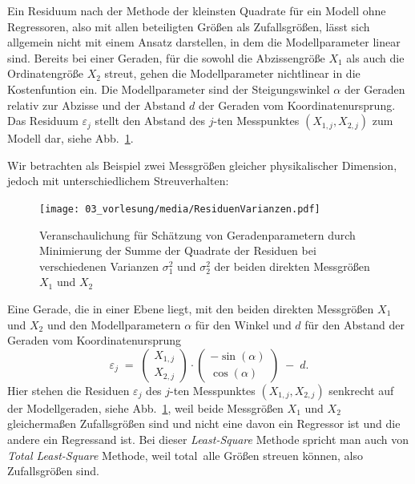 Ein Residuum nach der Methode der kleinsten Quadrate für ein Modell ohne Regressoren,
also mit allen beteiligten Größen als Zufallsgrößen, lässt sich allgemein nicht mit
einem Ansatz darstellen, in dem die Modellparameter linear sind. Bereits bei einer
Geraden, für die sowohl die Abzissengröße $X_1$ als auch die Ordinatengröße $X_2$ streut,
gehen die Modellparameter nichtlinear in die Kostenfuntion ein.
Die Modellparameter sind der Steigungswinkel $\alpha$ der Geraden relativ zur Abzisse und
der Abstand $d$ der Geraden vom Koordinatenursprung. Das Residuum $\varepsilon_j$ stellt den
Abstand des $j$-ten Messpunktes $(X_{1,j}, X_{2,j})$ zum Modell dar, siehe Abb.~\ref{ResiduenVarianzen}.

Wir betrachten als Beispiel zwei Messgrößen gleicher physikalischer Dimension, jedoch
mit unterschiedlichem Streuverhalten:
\begin{figure}
\begin{center}
\texttt{[image: 03\_vorlesung/media/ResiduenVarianzen.pdf]}
\end{center}
\caption{Veranschaulichung für Schätzung von Geradenparametern durch
Minimierung der Summe der Quadrate der Residuen bei verschiedenen Varianzen
$\sigma_1^2$ und $\sigma_2^2$ der beiden direkten Messgrößen $X_1$ und $X_2$
\label{ResiduenVarianzen}}
\end{figure}
Eine Gerade, die in einer Ebene liegt, mit den beiden direkten Messgrößen $X_1$ und $X_2$
und den Modellparametern $\alpha$ für den Winkel und
$d$ für den Abstand der Geraden vom Koordinatenursprung
\begin{equation}
\varepsilon_j \; = \;
\left(\begin{array}{c} X_{1,j}\\ X_{2,j}\end{array}\right) \cdot
\left(\begin{array}{c} -\sin(\alpha)\\ \cos(\alpha)\end{array}\right) \; - \; d .
\label{TLSgerade}
\end{equation}
Hier stehen die Residuen $\varepsilon_j$ des $j$-ten Messpunktes $(X_{1,j}, X_{2,j})$
senkrecht auf der Modellgeraden, siehe Abb.~\ref{ResiduenVarianzen}, weil beide
Messgrößen $X_1$ und $X_2$ gleichermaßen Zufallsgrößen sind und nicht eine davon
ein Regressor ist und die andere ein Regressand ist. Bei dieser \textsl{Least-Square} Methode
spricht man auch von \textsl{Total Least-Square} Methode, weil \glqq total\grqq ~alle Größen
streuen können, also Zufallsgrößen sind.

